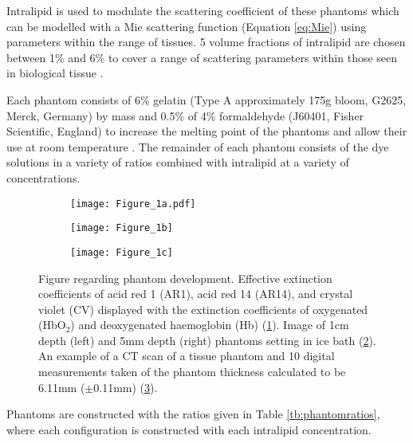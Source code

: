 Intralipid is used to modulate the scattering coefficient of these phantoms which can be modelled with a Mie scattering function (Equation \eqref{eq:Mie}) using parameters within the range of tissues. 5 volume fractions of intralipid are chosen between 1\% and 6\% to cover a range of scattering parameters within those seen in biological tissue \cite{Jacques2013}. 

Each phantom consists of 6\% gelatin (Type A approximately 175g bloom, G2625, Merck, Germany) by mass %
and 0.5\% of 4\% formaldehyde (J60401, Fisher Scientific, England) to increase the melting point of the phantoms and allow their use at room temperature \cite{Pogue2006}. The remainder of each phantom consists of the dye solutions in a variety of ratios combined with intralipid at a variety of concentrations. 

\begin{figure}[htb!]
    \centering
    \begin{subfigure}{\textwidth}
        \texttt{[image: Figure\_1a.pdf]}
        \caption{}
        \label{fig:exteff}
    \end{subfigure}
    \hfill
    \begin{subfigure}{0.6\textwidth}
        \texttt{[image: Figure\_1b]}
        \caption{}
        \label{fig:icebath}
    \end{subfigure}
    \begin{subfigure}{0.33\textwidth}
        \texttt{[image: Figure\_1c]}
        \caption{}
        \label{fig:DICOM_Eg}
    \end{subfigure}
    \caption{Figure regarding phantom development. Effective extinction coefficients of acid red 1 (AR1), acid red 14 (AR14), and crystal violet (CV) displayed with the extinction coefficients of oxygenated (HbO$_2$) and deoxygenated haemoglobin (Hb) (\ref{fig:exteff}). Image of 1cm depth (left) and 5mm depth (right) phantoms setting in ice bath (\ref{fig:icebath}). An example of a CT scan of a tissue phantom and 10 digital measurements taken of the phantom thickness calculated to be 6.11mm ($\pm$0.11mm) (\ref{fig:DICOM_Eg}).}
    \label{fig:phantommethods}
\end{figure}

Phantoms are constructed with the ratios given in Table \ref{tb:phantomratios}, where each configuration is constructed with each intralipid concentration. 

